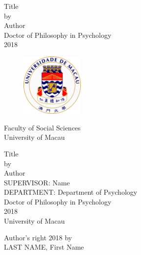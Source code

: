\documentclass[a4paper, 12pt, twoside]{article}
\begin{document}
\begin{titlepage}
	\begin{center}
	\doublespacing
	Title\\
	[1.5cm]
	by\\
	[1.5cm]
	Author\\
	[2.4cm]
	Doctor of Philosophy in Psychology\\
	[5cm]
	2018\\
		\begin{figure}[h]
			\centering
			\includegraphics[width = 31mm]{fig/umac_logo}
		\end{figure}
	Faculty of Social Sciences\\
	University of Macau
	\end{center}
\end{titlepage}
\begin{titlepage}
	\begin{center}
	\doublespacing
	Title\\
	[1.5cm]
	by\\
	[1.5cm]
	Author\\
	[1.5cm]
	SUPERVISOR: Name\\
	[1.5cm]
	DEPARTMENT: Department of Psychology\\
	[1.5cm]
	Doctor of Philosophy in Psychology\\
	[1.5cm]
	2018\\
	[1.5cm]
	University of Macau
	\end{center}
\end{titlepage}
\begin{titlepage}
\begin{center}
Author's right 2018 by\\
LAST NAME, First Name
\end{center}
\end{titlepage}

\newpage\null\thispagestyle{empty}\newpage
\end{document}
